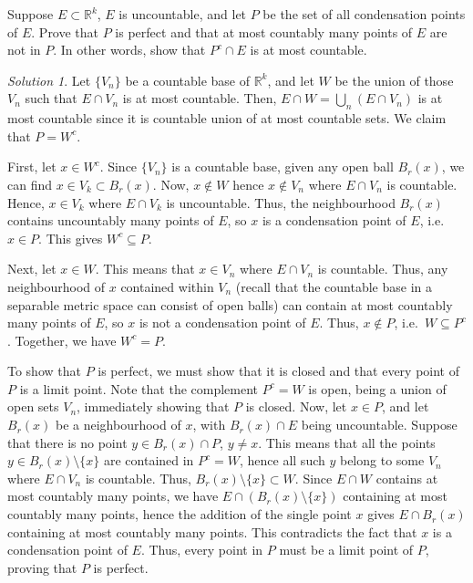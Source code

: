 \documentclass[11pt]{report}
\def\R{\mathbb{R}}
\theoremstyle{remark}
\newtheorem*{solution}{Solution}
\begin{document}
    Suppose $E \subset \R^k$, $E$ is uncountable, and let $P$ be the set of all
    condensation points of $E$. Prove that $P$ is perfect and that at most countably
    many points of $E$ are not in $P$. In other words, show that $P^c \cap E$ is at
    most countable.
    \begin{solution}
        Let $\{V_n\}$ be a countable base of $\R^k$, and let $W$ be the union of
        those $V_n$ such that $E \cap V_n$ is at most countable. Then, $E \cap W =
        \bigcup_n (E \cap V_n)$ is at most countable since it is countable union of
        at most countable sets. We claim that $P = W^c$.

        First, let $x \in W^c$. Since $\{V_n\}$ is a countable base, given any open
        ball $B_r(x)$, we can find $x \in V_k \subset B_r(x)$. Now, $x \notin W$
        hence $x \notin V_n$ where $E \cap V_n$ is countable. Hence, $x \in V_k$
        where $E \cap V_k$ is uncountable. Thus, the neighbourhood $B_r(x)$ contains
        uncountably many points of $E$, so $x$ is a condensation point of $E$, i.e.\
        $x \in P$. This gives $W^c \subseteq P$.

        Next, let $x \in W$. This means that $x \in V_n$ where $E\cap V_n$ is
        countable. Thus, any neighbourhood of $x$ contained within $V_n$ (recall
        that the countable base in a separable metric space can consist of open
        balls) can contain at most countably many points of $E$, so $x$ is not a
        condensation point of $E$. Thus, $x \notin P$, i.e.\ $W \subseteq P^c$.
        Together, we have $W^c = P$.

        To show that $P$ is perfect, we must show that it is closed and that every
        point of $P$ is a limit point. Note that the complement $P^c = W$ is open,
        being a union of open sets $V_n$, immediately showing that $P$ is closed.
        Now, let $x \in P$, and let $B_r(x)$ be a neighbourhood of $x$, with $B_r(x)
        \cap E$ being uncountable. Suppose that there is no point $y \in B_r(x) \cap
        P$, $y \neq x$. This means that all the points $y \in B_r(x)\setminus\{x\}$
        are contained in $P^c = W$, hence all such $y$ belong to some $V_n$ where
        $E \cap V_n$ is countable. Thus, $B_r(x) \setminus\{x\} \subset W$. Since $E
        \cap W$ contains at most countably many points, we have $E \cap (B_r(x)
        \setminus\{x\})$ containing at most countably many points, hence the
        addition of the single point $x$ gives $E \cap B_r(x)$ containing at most
        countably many points. This contradicts the fact that $x$ is a condensation
        point of $E$. Thus, every point in $P$ must be a limit point of $P$, proving
        that $P$ is perfect.
    \end{solution}
\end{document}
